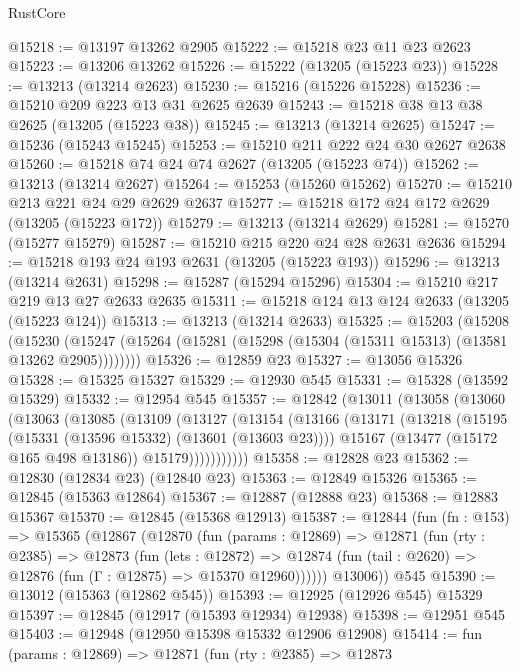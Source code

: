 \begin{lexlean}{RustCore}
\begin{coremodule}
@15218 := @13197 @13262 @2905
@15222 := @15218 @23 @11 @23 @2623
@15223 := @13206 @13262
@15226 := @15222 (@13205 (@15223 @23))
@15228 := @13213 (@13214 @2623)
@15230 := @15216 (@15226 @15228)
@15236 := @15210 @209 @223 @13 @31 @2625 @2639
@15243 := @15218 @38 @13 @38 @2625 (@13205 (@15223 @38))
@15245 := @13213 (@13214 @2625)
@15247 := @15236 (@15243 @15245)
@15253 := @15210 @211 @222 @24 @30 @2627 @2638
@15260 := @15218 @74 @24 @74 @2627 (@13205 (@15223 @74))
@15262 := @13213 (@13214 @2627)
@15264 := @15253 (@15260 @15262)
@15270 := @15210 @213 @221 @24 @29 @2629 @2637
@15277 := @15218 @172 @24 @172 @2629 (@13205 (@15223 @172))
@15279 := @13213 (@13214 @2629)
@15281 := @15270 (@15277 @15279)
@15287 := @15210 @215 @220 @24 @28 @2631 @2636
@15294 := @15218 @193 @24 @193 @2631 (@13205 (@15223 @193))
@15296 := @13213 (@13214 @2631)
@15298 := @15287 (@15294 @15296)
@15304 := @15210 @217 @219 @13 @27 @2633 @2635
@15311 := @15218 @124 @13 @124 @2633 (@13205 (@15223 @124))
@15313 := @13213 (@13214 @2633)
@15325 := @15203
    (@15208
      (@15230 (@15247 (@15264 (@15281 (@15298 (@15304 (@15311 @15313) (@13581 @13262 @2905))))))))
@15326 := @12859 @23
@15327 := @13056 @15326
@15328 := @15325 @15327
@15329 := @12930 @545
@15331 := @15328 (@13592 @15329)
@15332 := @12954 @545
@15357 := @12842
    (@13011
      (@13058
        (@13060
          (@13063
            (@13085
              (@13109
                (@13127
                  (@13154
                    (@13166
                      (@13171
                        (@13218
                          (@15195 (@15331 (@13596 @15332) (@13601 (@13603 @23))))
                          @15167
                          (@13477 (@15172 @165 @498 @13186))
                          @15179)))))))))))
@15358 := @12828 @23
@15362 := @12830 (@12834 @23) (@12840 @23)
@15363 := @12849 @15326
@15365 := @12845 (@15363 @12864)
@15367 := @12887 (@12888 @23)
@15368 := @12883 @15367
@15370 := @12845 (@15368 @12913)
@15387 := @12844
    (fun (fn : @153) =>
    @15365
      (@12867
        (@12870
          (fun (params : @12869) =>
          @12871
            (fun (rty : @2385) =>
            @12873
              (fun (lets : @12872) =>
              @12874 (fun (tail : @2620) => @12876 (fun (Γ : @12875) => @15370 @12960))))))
        @13006))
    @545
@15390 := @13012 (@15363 (@12862 @545))
@15393 := @12925 (@12926 @545) @15329
@15397 := @12845 (@12917 (@15393 @12934) @12938)
@15398 := @12951 @545
@15403 := @12948 (@12950 @15398 @15332 @12906 @12908)
@15414 := fun (params : @12869) =>
  @12871
    (fun (rty : @2385) =>
    @12873

\end{coremodule}
\end{lexlean}
